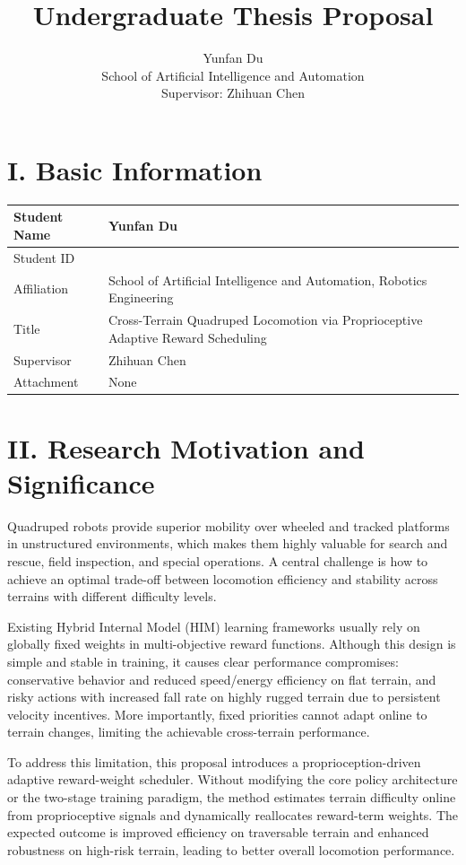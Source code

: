 \documentclass{article}
\title{Undergraduate Thesis Proposal}
\author{Yunfan Du\\School of Artificial Intelligence and Automation\\Supervisor: Zhihuan Chen}
\date{}
\begin{document}
\maketitle

\section*{I. Basic Information}
\begin{longtable}{|>{\raggedright\arraybackslash}p{3.8cm}|>{\raggedright\arraybackslash}p{10.5cm}|}
\hline
Student Name & Yunfan Du \\
\hline
Student ID & 202204416388 \\
\hline
Affiliation & School of Artificial Intelligence and Automation, Robotics Engineering \\
\hline
Title & Cross-Terrain Quadruped Locomotion via Proprioceptive Adaptive Reward Scheduling \\
\hline
Supervisor & Zhihuan Chen \\
\hline
Attachment & None \\
\hline
\end{longtable}

\section*{II. Research Motivation and Significance}
Quadruped robots provide superior mobility over wheeled and tracked platforms in unstructured environments, which makes them highly valuable for search and rescue, field inspection, and special operations. A central challenge is how to achieve an optimal trade-off between locomotion efficiency and stability across terrains with different difficulty levels.

Existing Hybrid Internal Model (HIM) learning frameworks usually rely on globally fixed weights in multi-objective reward functions. Although this design is simple and stable in training, it causes clear performance compromises: conservative behavior and reduced speed/energy efficiency on flat terrain, and risky actions with increased fall rate on highly rugged terrain due to persistent velocity incentives. More importantly, fixed priorities cannot adapt online to terrain changes, limiting the achievable cross-terrain performance.

To address this limitation, this proposal introduces a proprioception-driven adaptive reward-weight scheduler. Without modifying the core policy architecture or the two-stage training paradigm, the method estimates terrain difficulty online from proprioceptive signals and dynamically reallocates reward-term weights. The expected outcome is improved efficiency on traversable terrain and enhanced robustness on high-risk terrain, leading to better overall locomotion performance.
\end{document}
